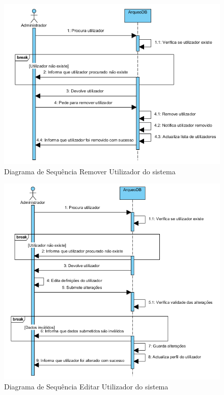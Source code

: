 ﻿\documentclass[12pt,a4paper]{article}
\begin{document}
\begin{figure}[h!]
\centering
\includegraphics[scale=1]{sequencia/A_removerutilizador}
\caption{Diagrama de Sequência Remover Utilizador do sistema} 
\end{figure}  

\begin{figure}[h!]
\centering
\includegraphics[scale=1]{sequencia/A_editarutilizador}
\caption{Diagrama de Sequência Editar Utilizador do sistema} 
\end{figure}  
\end{document}

